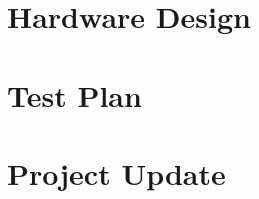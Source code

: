 \documentclass[11pt,letterpaper]{article}
\begin{document}
\section{Hardware Design}
\label{sec:hardware-design}

\clearpage

\section{Test Plan}
\label{sec:test-plan}

\clearpage

\section{Project Update}
\label{sec:project-update}

\clearpage

%
\end{document}
